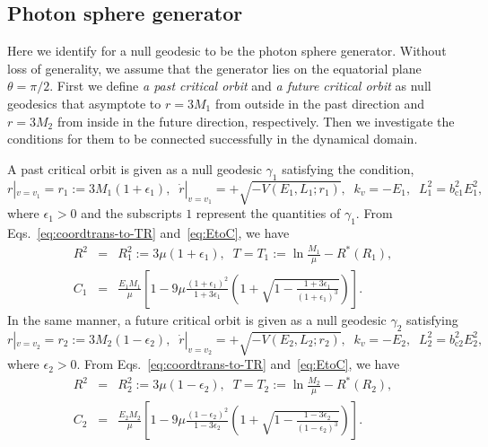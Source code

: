 \documentclass[prd,showpacs,preprintnumbers,groupedaddress,superscriptaddress,nofootinbib,11pt]{revtex4-1} %
\theoremstyle{newplain}
\newcommand{\mr}[1]{\mathrm{#1}}
\begin{document}
\subsection{Photon sphere generator}
\label{sec:ps-generator}
Here we identify for a null geodesic to be the photon sphere generator.
Without loss of generality, we assume that the generator lies on the equatorial plane $\theta=\pi/2$.
First we define {\it a past critical orbit} and {\it a future critical orbit} as null geodesics that asymptote to $r=3M_1$ from outside in the past direction and $r=3M_2$ from inside in the future direction, respectively.
Then we investigate the conditions for them to be connected successfully in the dynamical domain.
\par
A past critical orbit is given as a null geodesic $\gamma_1$ satisfying the condition,
\begin{equation}
\label{eq:gamma1-condition}
r|_{v=v_1}=r_1:=3M_1(1+\epsilon_1),\;\;
\dot{r}|_{v=v_1}=+\sqrt{-V(E_1,L_1;r_1)},\;\;
k_v=-E_1,\;\;
L_1^2=b_{\mr{c}1}^2E_1^2,
\end{equation}
where $\epsilon_1>0$ and the subscripts $1$ represent the quantities of $\gamma_1$.
From Eqs.~\eqref{eq:coordtrans-to-TR} and~\eqref{eq:EtoC}, we have
\begin{eqnarray}
\label{eq:R1-T1}
R^2&=&R_1^2:=3\mu(1+\epsilon_1),\;\;
T=T_1:=\ln\frac{M_1}{\mu}-R^*(R_1),\\
\label{eq:critical-C1}
C_1
&=&\frac{E_1M_1}{\mu}\left[1-9\mu\frac{(1+\epsilon_1)^2}{1+3\epsilon_1}\left(1+\sqrt{1-\frac{1+3\epsilon_1}{(1+\epsilon_1)^3}}\right)\right].
\end{eqnarray}
In the same manner, a future critical orbit is given as a null geodesic $\gamma_2$ satisfying
\begin{equation}
\label{eq:gamma2-condition}
r|_{v=v_2}=r_2:=3M_2(1-\epsilon_2),\;\;
\dot{r}|_{v=v_2}=+\sqrt{-V(E_2,L_2;r_2)},\;\;
k_v=-E_2,\;\;
L_2^2=b_{\mr{c}2}^2E_2^2,
\end{equation}
where $\epsilon_2>0$.
From Eqs.~\eqref{eq:coordtrans-to-TR} and~\eqref{eq:EtoC}, we have
\begin{eqnarray}
\label{eq:R2-T2}
R^2&=&R_2^2:=3\mu(1-\epsilon_2),\;\;
T=T_2:=\ln\frac{M_2}{\mu}-R^*(R_2),\\
\label{eq:critical-C2}
C_2
&=&\frac{E_2M_2}{\mu}\left[1-9\mu\frac{(1-\epsilon_2)^2}{1-3\epsilon_2}\left(1+\sqrt{1-\frac{1-3\epsilon_2}{(1-\epsilon_2)^3}}\right)\right].
\end{eqnarray}
\end{document}
